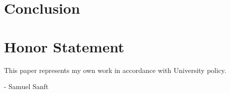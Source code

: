 \documentclass[pageno]{jpaper}
\begin{document}
\begin{doublespacing}
\section{Conclusion}

\section{Honor Statement}
This paper represents my own work in accordance with University policy.

\begin{flushright}
- Samuel Sanft
\end{flushright}

\end{doublespacing}



\end{document}
